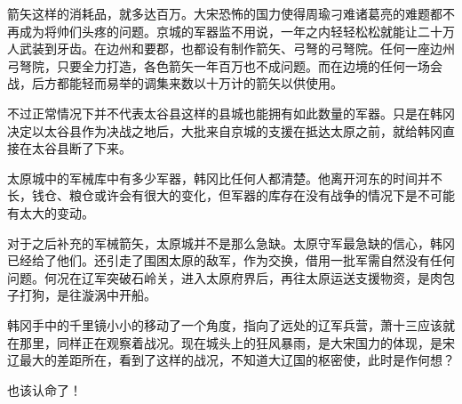 箭矢这样的消耗品，就多达百万。大宋恐怖的国力使得周瑜刁难诸葛亮的难题都不再成为将帅们头疼的问题。京城的军器监不用说，一年之内轻轻松松就能让二十万人武装到牙齿。在边州和要郡，也都设有制作箭矢、弓弩的弓弩院。任何一座边州弓弩院，只要全力打造，各色箭矢一年百万也不成问题。而在边境的任何一场会战，后方都能轻而易举的调集来数以十万计的箭矢以供使用。

不过正常情况下并不代表太谷县这样的县城也能拥有如此数量的军器。只是在韩冈决定以太谷县作为决战之地后，大批来自京城的支援在抵达太原之前，就给韩冈直接在太谷县断了下来。

太原城中的军械库中有多少军器，韩冈比任何人都清楚。他离开河东的时间并不长，钱仓、粮仓或许会有很大的变化，但军器的库存在没有战争的情况下是不可能有太大的变动。

对于之后补充的军械箭矢，太原城并不是那么急缺。太原守军最急缺的信心，韩冈已经给了他们。还引走了围困太原的敌军，作为交换，借用一批军需自然没有任何问题。何况在辽军突破石岭关，进入太原府界后，再往太原运送支援物资，是肉包子打狗，是往漩涡中开船。

韩冈手中的千里镜小小的移动了一个角度，指向了远处的辽军兵营，萧十三应该就在那里，同样正在观察着战况。现在城头上的狂风暴雨，是大宋国力的体现，是宋辽最大的差距所在，看到了这样的战况，不知道大辽国的枢密使，此时是作何想？

也该认命了！
